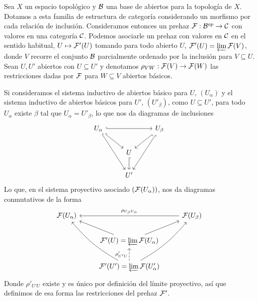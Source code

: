 \documentclass[twoside]{article}
\begin{document}
\begin{ej}[EGA, 0-3.2.1]\label{prehaztop}%
Sea $X$ un espacio topológico y ${\mathcal B}$ una base de abiertos para la topología de $X$. Dotamos a esta familia de estructura de categoría considerando un morfismo por cada relación de inclusión. Consideramos entonces un prehaz $\mathcal{F}:{\mathcal B}^{op}\to{\mathcal C}$ con valores en una categoría ${\mathcal C}$. Podemos asociarle un prehaz con valores en ${\mathcal C}$ en el sentido habitual, $U\mapsto \mathcal{F}'(U)$ tomando para todo abierto $U$, $\mathcal{F}'(U)=\varprojlim\mathcal{F}(V)$, donde $V$ recorre el conjunto ${\mathcal B}$ parcialmente ordenado por la inclusión para $V\subseteq U$. Sean $U,U'$ abiertos con $U\subseteq U'$ y denotamos $\rho_{VW}:\mathcal{F}(V)\to\mathcal{F}(W)$ las restricciones dadas por $\mathcal{F}$ para $W\subseteq V$ abiertos básicos.

Si consideramos el sistema inductivo de abiertos básico para $U$, $(U_\alpha)$ y el sistema inductivo de abiertos básicos para $U'$, $(U'_\beta)$, como $U\subseteq U'$, para todo $U_\alpha$ existe $\beta$ tal que $U_\alpha=U'_\beta$, lo que nos da diagramas de inclusiones
\[
\begin{tikzcd}
U_\alpha\arrow[rr, hookrightarrow]\arrow[ddr, hookrightarrow]\arrow[dr, hookrightarrow]& & U_\beta\arrow[dl, hookrightarrow]\arrow[ddl,hookrightarrow]\\
& U\arrow[d, hookrightarrow]& \\
& U' &
\end{tikzcd}
\]
Lo que, en el sistema proyectivo asociado $(\mathcal{F}(U_\alpha))$, nos da diagramas conmutativos de la forma
\[
\begin{tikzcd}
\calF(U_\alpha)& & \calF(U_\beta)\arrow[ll, "\rho_{U_\beta U_\alpha}"']\\
& \calF'(U)=\varprojlim\calF(U_\alpha)\arrow[ur]\arrow[ul]& \\
& \calF'(U')=\varprojlim\calF(U'_\alpha)\arrow[u, dashed, "\rho'_{U'U}"]\arrow[uul,bend left=10] \arrow[uur,bend right=10]&
\end{tikzcd}
\]
Donde $\rho'_{U'U}$ existe y es único por definición del límite proyectivo, así que definimos de esa forma las restricciones del prehaz $\mathcal{F}'$.

\end{ej}
\end{document}
